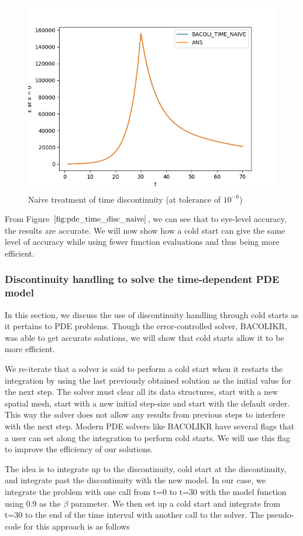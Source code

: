 \documentclass{article}
\begin{document}
\begin{figure}[H]
\centering
\includegraphics[width=0.7\linewidth]{./figures/pde_time_disc_naive}
\caption{Naive treatment of time discontinuity (at tolerance of $10^{-6}$)}
\label{fig:pde_time_disc_naive}
\end{figure}

From Figure $\ref{fig:pde_time_disc_naive}$, we can see that to eye-level accuracy, the results are accurate. We will now show how a cold start can give the same level of accuracy while using fewer function evaluations and thus being more efficient.

\subsubsection{Discontinuity handling to solve the time-dependent PDE model}
\label{subsubsection:pde_time_disc_hand}
In this section, we discuss the use of discontinuity handling through cold starts as it pertains to PDE problems. Though the error-controlled solver, BACOLIKR, was able to get accurate solutions, we will show that cold starts allow it to be more efficient.

We re-iterate that a solver is said to perform a cold start when it restarts the integration by using the last previously obtained solution as the initial value for the next step. The solver must clear all its data structures, start with a new spatial mesh, start with a new initial step-size and start with the default order. This way the solver does not allow any results from previous steps to interfere with the next step. Modern PDE solvers like BACOLIKR have several flags that a user can set along the integration to perform cold starts. We will use this flag to improve the efficiency of our solutions.

The idea is to integrate up to the discontinuity, cold start at the discontinuity, and integrate past the discontinuity with the new model. In our case, we integrate the problem with one call from t=0 to t=30 with the model function using 0.9 as the $\beta$ parameter. We then set up a cold start and integrate from t=30 to the end of the time interval with another call to the solver. The pseudo-code for this approach is as follows
\end{document}
